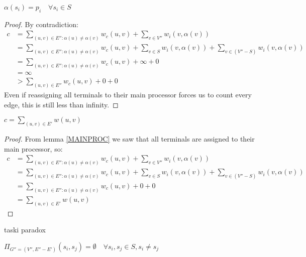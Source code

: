\documentclass{article}
\begin{document}
\begin{lemma}
\label{MAINPROC}
$\alpha(s_i) = p_i \quad \forall s_i \in S$
\end{lemma}
\begin{proof}
By contradiction:
\begin{align}
	\nonumber c 	& = \displaystyle\sum\limits_{(u,v) \in E'' : \alpha(u) \neq \alpha(v)} w_c(u,v) + \displaystyle\sum\limits_{v \in V''} w_i(v, \alpha(v)) \\
	\nonumber		& = \displaystyle\sum\limits_{(u,v) \in E'' : \alpha(u) \neq \alpha(v)} w_c(u,v) + \displaystyle\sum\limits_{v \in S} w_i(v, \alpha(v)) + \displaystyle\sum\limits_{v \in (V'' - S)} w_i(v, \alpha(v)) \\
	\nonumber		& = \displaystyle\sum\limits_{(u,v) \in E'' : \alpha(u) \neq \alpha(v)} w_c(u,v) + \infty + 0 \\
	\nonumber		& = \infty \\
	\nonumber		& > \displaystyle\sum\limits_{(u,v) \in E''} w_c(u,v) + 0 + 0
\end{align}
Even if reassigning all terminals to their main processor forces us to count every edge, this is still less than infinity.
\end{proof}

\begin{corollary}
\label{COSTMIN}
$c = \displaystyle\sum\limits_{(u,v) \in E'} w(u,v)$
\end{corollary}

\begin{proof}
From lemma \ref{MAINPROC} we saw that all terminals are assigned to their main processor, so:
\begin{align}
	\nonumber c 	& = \displaystyle\sum\limits_{(u,v) \in E'' : \alpha(u) \neq \alpha(v)} w_c(u,v) + \displaystyle\sum\limits_{v \in V''} w_i(v, \alpha(v)) \\
	\nonumber		& = \displaystyle\sum\limits_{(u,v) \in E'' : \alpha(u) \neq \alpha(v)} w_c(u,v) + \displaystyle\sum\limits_{v \in S} w_i(v, \alpha(v)) + \displaystyle\sum\limits_{v \in (V'' - S)} w_i(v, \alpha(v)) \\
	\nonumber		& = \displaystyle\sum\limits_{(u,v) \in E'' : \alpha(u) \neq \alpha(v)} w_c(u,v) + 0 + 0 \\
	\nonumber		& = \displaystyle\sum\limits_{(u,v) \in E'} w(u,v)
\end{align}
\end{proof}

\banach taski paradox

\begin{lemma}
\label{BREAKPATH}
$\Pi_{G''=(V'', E'' - E')} (s_i, s_j) = \emptyset \quad \forall s_i, s_j \in S, s_i \neq s_j$
\end{lemma}
\end{document}
